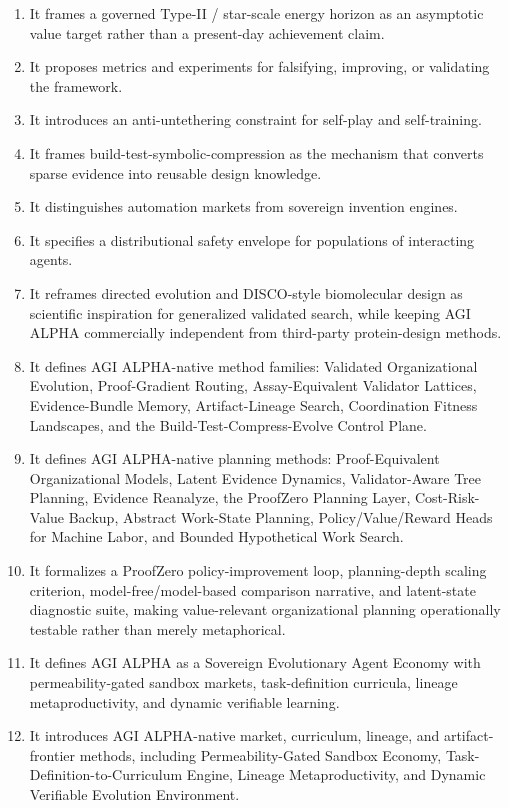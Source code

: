 \documentclass[11pt]{article}
\begin{document}
\begin{enumerate}
\item
  It frames a governed Type-II / star-scale energy horizon as an asymptotic value target rather than a present-day achievement claim.
\item
  It proposes metrics and experiments for falsifying, improving, or validating the framework.
\item
  It introduces an anti-untethering constraint for self-play and self-training.
\item
  It frames build-test-symbolic-compression as the mechanism that converts sparse evidence into reusable design knowledge.
\item
  It distinguishes automation markets from sovereign invention engines.
\item
  It specifies a distributional safety envelope for populations of interacting agents.
\item
  It reframes directed evolution and DISCO-style biomolecular design as scientific inspiration for generalized validated search, while keeping AGI ALPHA commercially independent from third-party protein-design methods.
\item
  It defines AGI ALPHA-native method families: Validated Organizational Evolution, Proof-Gradient Routing, Assay-Equivalent Validator Lattices, Evidence-Bundle Memory, Artifact-Lineage Search, Coordination Fitness Landscapes, and the Build-Test-Compress-Evolve Control Plane.
\item
  It defines AGI ALPHA-native planning methods: Proof-Equivalent Organizational Models, Latent Evidence Dynamics, Validator-Aware Tree Planning, Evidence Reanalyze, the ProofZero Planning Layer, Cost-Risk-Value Backup, Abstract Work-State Planning, Policy/Value/Reward Heads for Machine Labor, and Bounded Hypothetical Work Search.
\item
  It formalizes a ProofZero policy-improvement loop, planning-depth scaling criterion, model-free/model-based comparison narrative, and latent-state diagnostic suite, making value-relevant organizational planning operationally testable rather than merely metaphorical.
\item
  It defines AGI ALPHA as a Sovereign Evolutionary Agent Economy with permeability-gated sandbox markets, task-definition curricula, lineage metaproductivity, and dynamic verifiable learning.
\item
  It introduces AGI ALPHA-native market, curriculum, lineage, and artifact-frontier methods, including Permeability-Gated Sandbox Economy, Task-Definition-to-Curriculum Engine, Lineage Metaproductivity, and Dynamic Verifiable Evolution Environment.

\end{enumerate}
\end{document}
